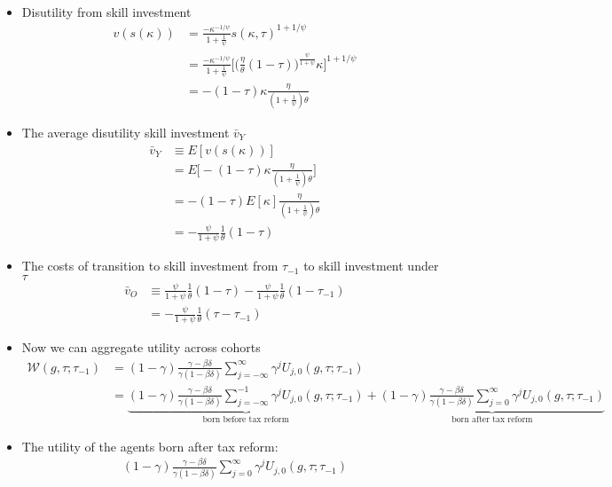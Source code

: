 \documentclass{article}
\begin{document}
\begin{itemize}
\begin{align*}
\end{align*}
\item Disutility from skill investment
\begin{align*}
v(s(\kappa)) 
&= \frac{-\kappa^{-1/\psi}}{1+\frac{1}{\psi}} s(\kappa,\tau)^{1+1/\psi}\\
&= \frac{-\kappa^{-1/\psi}}{1+\frac{1}{\psi}}\Bigg[\Big( \frac{\eta}{\theta}(1-\tau)\Big)^{\frac{\psi}{1 + \psi}}\kappa \Bigg]^{1+1/\psi}\\
&= -(1-\tau)\kappa\frac{\eta}{(1+\frac{1}{\psi})\theta}
\end{align*}
\item The average disutility skill investment $\bar v_Y$
\begin{align*}
\bar v_Y 
&\equiv E[v(s(\kappa))] \\
&= E\Bigg[-(1-\tau)\kappa\frac{\eta}{(1+\frac{1}{\psi})\theta}\Bigg]\\
&= -(1-\tau)E[\kappa]\frac{\eta}{(1+\frac{1}{\psi})\theta}\\
&= - \frac{\psi}{1+\psi} \frac{1}{\theta}(1-\tau)
\end{align*}
\item The costs of transition to skill investment from $\tau_{-1}$ to skill investment under $\tau$ 
\begin{align*}
\bar v_O
&\equiv \frac{\psi}{1+\psi} \frac{1}{\theta}(1-\tau) - \frac{\psi}{1+\psi} \frac{1}{\theta}(1-\tau_{-1})\\
&= -\frac{\psi}{1+\psi} \frac{1}{\theta}(\tau - \tau_{-1})
\end{align*}
\item Now we can aggregate utility across cohorts
\begin{align*}
\mathcal{W}(g, \tau; \tau_{-1}) 
&= (1-\gamma) \frac{\gamma - \beta \delta}{\gamma(1-\beta\delta)} \sum_{j = -\infty}^\infty \gamma^j U_{j,0} (g, \tau; \tau_{-1})\\
&= \underbrace{(1-\gamma) \frac{\gamma - \beta \delta}{\gamma(1-\beta\delta)} \sum_{j = -\infty}^{-1} \gamma^j U_{j,0} (g, \tau; \tau_{-1})}_{\text{born before tax reform}}
+ \underbrace{(1-\gamma) \frac{\gamma - \beta \delta}{\gamma(1-\beta\delta)} \sum_{j = 0}^{\infty} \gamma^j U_{j,0} (g, \tau; \tau_{-1})}_{\text{born after tax reform}}
\end{align*}
\item The utility of the agents born after tax reform:
\begin{align*}
(1-\gamma) \frac{\gamma - \beta \delta}{\gamma(1-\beta\delta)} \sum_{j = 0}^{\infty} \gamma^j U_{j,0} (g, \tau; \tau_{-1})

\end{align*}
\end{itemize}
\end{document}
